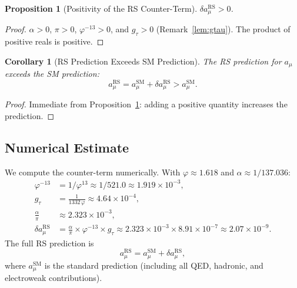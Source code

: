 \documentclass[12pt,a4paper]{article}
\newtheorem{corollary}[theorem]{Corollary}
\newtheorem{proposition}[theorem]{Proposition}
\theoremstyle{definition}
\theoremstyle{remark}
\begin{document}
\begin{proposition}[Positivity of the RS Counter-Term]
\label{thm:positive}
$\delta a_\mu^{\mathrm{RS}} > 0$.
\end{proposition}

\begin{proof}
$\alpha > 0$, $\pi > 0$, $\varphi^{-13} > 0$, and $g_\tau > 0$
(Remark~\ref{lem:gtau}).
The product of positive reals is positive.
\end{proof}

\begin{corollary}[RS Prediction Exceeds SM Prediction]
\label{thm:exceeds}
The RS prediction for $a_\mu$ exceeds the SM prediction:
\begin{equation}
  a_\mu^{\mathrm{RS}} = a_\mu^{\mathrm{SM}} + \delta a_\mu^{\mathrm{RS}}
  > a_\mu^{\mathrm{SM}}.
\end{equation}
\end{corollary}

\begin{proof}
Immediate from Proposition~\ref{thm:positive}: adding a positive quantity
increases the prediction.
\end{proof}

\subsection{Numerical Estimate}

We compute the counter-term numerically.  With
$\varphi \approx 1.618$ and $\alpha \approx 1/137.036$:
\begin{align}
  \varphi^{-13} &= 1/\varphi^{13} \approx 1/521.0
  \approx 1.919 \times 10^{-3}, \\
  g_{\tau} &= \frac{1}{1332\,\varphi}
  \approx 4.64 \times 10^{-4}, \\
  \frac{\alpha}{\pi} &\approx 2.323 \times 10^{-3}, \\[4pt]
  \delta a_\mu^{\mathrm{RS}} &= \frac{\alpha}{\pi} \times
  \varphi^{-13} \times g_{\tau}
  \approx 2.323 \times 10^{-3} \times 8.91 \times 10^{-7}
  \approx 2.07 \times 10^{-9}.
\end{align}
The full RS prediction is
\begin{equation}
  a_\mu^{\mathrm{RS}} = a_\mu^{\mathrm{SM}}
  + \delta a_\mu^{\mathrm{RS}},
\end{equation}
where $a_\mu^{\mathrm{SM}}$ is the standard prediction (including all
QED, hadronic, and electroweak contributions).
\end{document}
